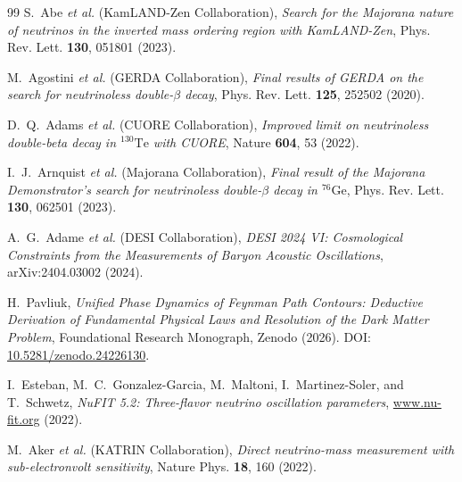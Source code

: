 \documentclass[11pt,a4paper]{article}
\theoremstyle{definition}
\begin{document}
\begin{thebibliography}{99}
S.~Abe \textit{et al.} (KamLAND-Zen Collaboration), \textit{Search for the Majorana nature of neutrinos in the inverted mass ordering region with KamLAND-Zen}, Phys. Rev. Lett. \textbf{130}, 051801 (2023).

M.~Agostini \textit{et al.} (GERDA Collaboration), \textit{Final results of GERDA on the search for neutrinoless double-$\beta$ decay}, Phys. Rev. Lett. \textbf{125}, 252502 (2020).

D.~Q.~Adams \textit{et al.} (CUORE Collaboration), \textit{Improved limit on neutrinoless double-beta decay in $^{130}\mathrm{Te}$ with CUORE}, Nature \textbf{604}, 53 (2022).

I.~J.~Arnquist \textit{et al.} (Majorana Collaboration), \textit{Final result of the Majorana Demonstrator's search for neutrinoless double-$\beta$ decay in $^{76}\mathrm{Ge}$}, Phys. Rev. Lett. \textbf{130}, 062501 (2023).

A.~G.~Adame \textit{et al.} (DESI Collaboration), \textit{DESI 2024 VI: Cosmological Constraints from the Measurements of Baryon Acoustic Oscillations}, arXiv:2404.03002 (2024).

H.~Pavliuk, \textit{Unified Phase Dynamics of Feynman Path Contours: Deductive Derivation of Fundamental Physical Laws and Resolution of the Dark Matter Problem}, Foundational Research Monograph, Zenodo (2026). DOI: \href{https://doi.org/10.5281/zenodo.24226130}{10.5281/zenodo.24226130}.

I.~Esteban, M.~C.~Gonzalez-Garcia, M.~Maltoni, I.~Martinez-Soler, and T.~Schwetz, \textit{NuFIT 5.2: Three-flavor neutrino oscillation parameters}, \href{http://www.nu-fit.org}{www.nu-fit.org} (2022).

M.~Aker \textit{et al.} (KATRIN Collaboration), \textit{Direct neutrino-mass measurement with sub-electronvolt sensitivity}, Nature Phys. \textbf{18}, 160 (2022).

\end{thebibliography}
\end{document}
